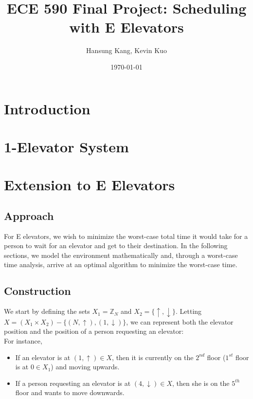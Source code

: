 \documentclass[letterpaper]{article} %
\begin{document}
\title{ECE 590 Final Project: Scheduling with E Elevators}
\author{Hansung Kang, Kevin Kuo}
\date{\today}
\maketitle

\section{Introduction}

\section{1-Elevator System}

\section{Extension to E Elevators}

\subsection{Approach}
For E elevators, we wish to minimize the worst-case total time it would take for a person to wait for an elevator and get to their destination. In the following sections, we model the environment mathematically and, through a worst-case time analysis, arrive at an optimal algorithm to minimize the worst-case time. 

\subsection{Construction}
We start by defining the sets $X_1 = \mathbb{Z}_N$ and $X_2 = \{\uparrow, \downarrow\}$. Letting $X = (X_1 \times X_2) - \{(N, \uparrow), (1, \downarrow)\}$, we can represent both the elevator position and the position of a person requesting an elevator:\\

For instance, 
\begin{itemize}
	\item If an elevator is at $(1, \uparrow) \in X$, then it is currently on the $2^{nd}$ floor ($1^{st}$ floor is at $0 \in X_1$) and moving upwards.
	\item If a person requesting an elevator is at $(4, \downarrow) \in X$, then she is on the $5^{th}$ floor and wants to move downwards. 
\end{itemize}
\end{document}
